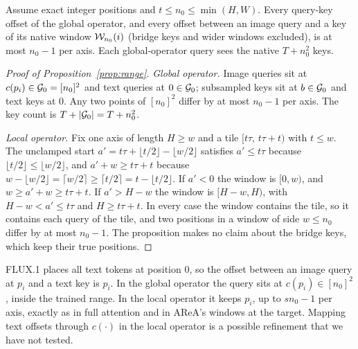 \begin{proposition}
\label{prop:range}
Assume exact integer positions and $t\le n_0\le\min(H,W)$. Every query-key offset of the global operator, and every offset between an image query and a key of its native window $\mathcal{W}_{n_0}(i)$ (bridge keys and wider windows excluded), is at most $n_0-1$ per axis. Each global-operator query sees the native $T+n_0^2$ keys.
\end{proposition}
\begin{proof}[Proof of Proposition~\ref{prop:range}]
\emph{Global operator.} Image queries sit at $c(p_i)\in\mathcal{G}_{0}=[n_0]^2$ and text queries at $0\in\mathcal{G}_{0}$; subsampled keys sit at $b\in\mathcal{G}_{0}$ and text keys at $0$. Any two points of $[n_0]^2$ differ by at most $n_0-1$ per axis. The key count is $T+|\mathcal{G}_{0}|=T+n_0^2$.

\emph{Local operator.} Fix one axis of length $H\ge w$ and a tile $[t\tau,\,t\tau+t)$ with $t\le w$. The unclamped start $a'=t\tau+\lfloor t/2\rfloor-\lfloor w/2\rfloor$ satisfies $a'\le t\tau$ because $\lfloor t/2\rfloor\le\lfloor w/2\rfloor$, and $a'+w\ge t\tau+t$ because $w-\lfloor w/2\rfloor=\lceil w/2\rceil\ge\lceil t/2\rceil=t-\lfloor t/2\rfloor$. If $a'<0$ the window is $[0,w)$, and $w\ge a'+w\ge t\tau+t$. If $a'>H-w$ the window is $[H-w,H)$, with $H-w<a'\le t\tau$ and $H\ge t\tau+t$. In every case the window contains the tile, so it contains each query of the tile, and two positions in a window of side $w\le n_0$ differ by at most $n_0-1$. The proposition makes no claim about the bridge keys, which keep their true positions.
\end{proof}

\begin{remark}
\label{rem:text}
FLUX.1 places all text tokens at position 0, so the offset between an image query at $p_i$ and a text key is $p_i$. In the global operator the query sits at $c(p_i)\in[n_0]^2$, inside the trained range. In the local operator it keeps $p_i$, up to $sn_0-1$ per axis, exactly as in full attention and in AReA's windows at the target. Mapping text offsets through $c(\cdot)$ in the local operator is a possible refinement that we have not tested.
\end{remark}

